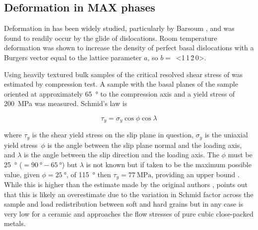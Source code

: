 \subsection{Deformation in MAX phases}

Deformation in  has been widely studied, particularly by Barsoum \cite{Farber1998,Barsoum1999,Farber1999,Barsoum1999dislocs_kinkbands,Barsoum2001}, and was found to readily occur by the glide of dislocations. Room temperature deformation was shown to increase the density of perfect basal dislocations with a Burgers vector equal to the lattice parameter $a$, so $b =$~<1\,1\,\={2}\,0>. 

Using heavily textured bulk samples of  the critical resolved shear stress of  was estimated by compression test. A sample with the basal planes of the sample oriented at approximately \SI{65}{\degree} to the compression axis and a yield stress of \SI{200}{\mega\pascal} was measured. Schmid's law is 

\begin{equation}
\tau_y = \sigma_y \cos{\phi} \cos{\lambda}
\end{equation}

where $\tau_y$ is the shear yield stress on the slip plane in question, $\sigma_y$ is the uniaxial yield stress\ $\phi$ is the angle between the slip plane normal and the loading axis, and $\lambda$ is the angle between the slip direction and the loading axis. The $\phi$ must be \SI{25}{\degree} ($=\SI{90}{\degree} - \SI{65}{\degree}$) but $\lambda$ is not known but if taken to be the maximum possible value, given $\phi=\SI{25}{\degree}$, of \SI{115}{\degree} then $\tau_y = \SI{77}{\mega\pascal}$, providing an upper bound \cite{Humphrey2012}. While this is higher than the estimate made by the original authors \cite{Barsoum1999}, \citet{Humphrey2012} points out that this is likely an overestimate due to the variation in Schmid factor across the sample and load redistribution between soft and hard grains but in any case is very low for a ceramic and approaches the flow stresses of pure cubic close-packed metals.


%
%
%
%
%
%
%
%
%
%
%
%


